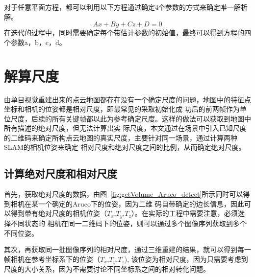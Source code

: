 对于任意平面方程，都可以利用以下方程通过确定4个参数的方式来确定唯一解析解。
\begin{equation}Ax+By+Cz+D= 0\label{equ:plane}\end{equation}
在迭代的过程中，同时需要确定每个带估计参数的初始值，最终可以得到方程的四个参数a，b，c，d。

\section{解算尺度}
\label{sec:4.3}
由单目视觉重建出来的点云地图都存在没有一个确定尺度的问题，地图中的特征点坐标和相机的位姿都是相对尺度，即最常见的采取初始化成
功后的前两帧作为单位尺度，后续的所有关键帧都以此为参考确定尺度。这样的做法可以获取到地图中所有描述的绝对尺度，但无法计算出实
际尺度，本文通过在场景中引入已知尺度的二维码来确定所构点云地图的真实尺度，主要针对同一场景，通过计算两种SLAM的相机位姿来确定
相对尺度和绝对尺度之间的比例，从而确定绝对尺度。
\subsection{计算绝对尺度和相对尺度}
首先，获取绝对尺度的数据，由图~\ref{fig:getVolume_Aruco_detect}所示同时可以得到相机在某一个确定的Aruco下的位姿，因为二维
码自带确定的边长信息，因此可以得到带有绝对尺度的相机位姿（$T_x$,$T_y$,$T_z$）。在实际的工程中需要注意，必须选择不同状态的
相机在同一二维码下的位姿，则可以通过多个图像序列获取到多个不同位姿。

其次，再获取同一批图像序列的相对尺度，通过三维重建的结果，就可以得到每一帧相机在参考坐标系下的位姿（$T_x$,$T_y$,$T_z$),
该位姿为相对尺度，因为只需要考虑到尺度的大小关系，因为不需要讨论不同坐标系之间的相对转化问题。
